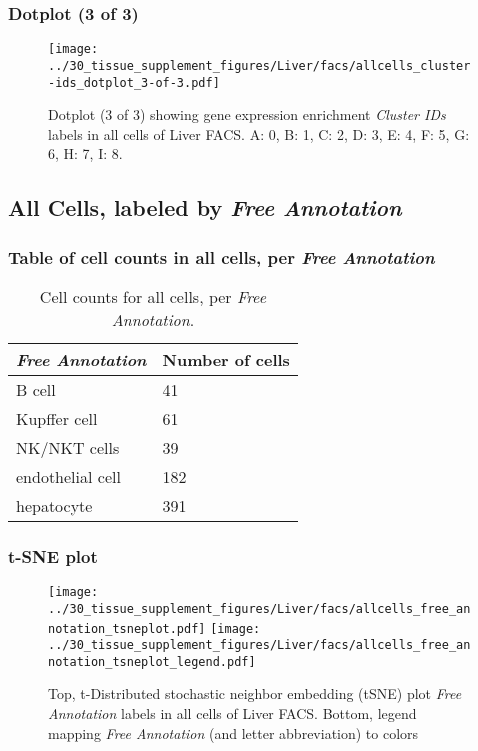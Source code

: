 \clearpage

\subsubsection{Dotplot (3 of 3)}
\begin{figure}[h]
\centering
\texttt{[image: ../30\_tissue\_supplement\_figures/Liver/facs/allcells\_cluster-ids\_dotplot\_3-of-3.pdf]}

\caption{ Dotplot (3 of 3)  showing gene expression enrichment \emph{Cluster IDs} labels in all cells of Liver FACS. A: 0, B: 1, C: 2, D: 3, E: 4, F: 5, G: 6, H: 7, I: 8.}
\end{figure}


\clearpage

\subsection{All Cells, labeled by \emph{Free Annotation}}
\subsubsection{Table of cell counts in all cells, per \emph{Free Annotation}}\begin{table}[h]
\centering
\label{my-label}
\begin{tabular}{@{}ll@{}}
\toprule

\emph{Free Annotation}& Number of cells \\ \midrule
B cell & 41 \\

Kupffer cell & 61 \\

NK/NKT cells & 39 \\

endothelial cell & 182 \\

hepatocyte & 391 \\
\bottomrule
\end{tabular}
\caption{Cell counts for all cells, per \emph{Free Annotation}.}
\end{table}

\clearpage
\subsubsection{t-SNE plot}
\begin{figure}[h]
\centering
\texttt{[image: ../30\_tissue\_supplement\_figures/Liver/facs/allcells\_free\_annotation\_tsneplot.pdf]}
\texttt{[image: ../30\_tissue\_supplement\_figures/Liver/facs/allcells\_free\_annotation\_tsneplot\_legend.pdf]}
\caption{Top, t-Distributed stochastic neighbor embedding (tSNE) plot  \emph{Free Annotation} labels in all cells of Liver FACS. Bottom, legend mapping \emph{Free Annotation} (and letter abbreviation) to colors}
\end{figure}


